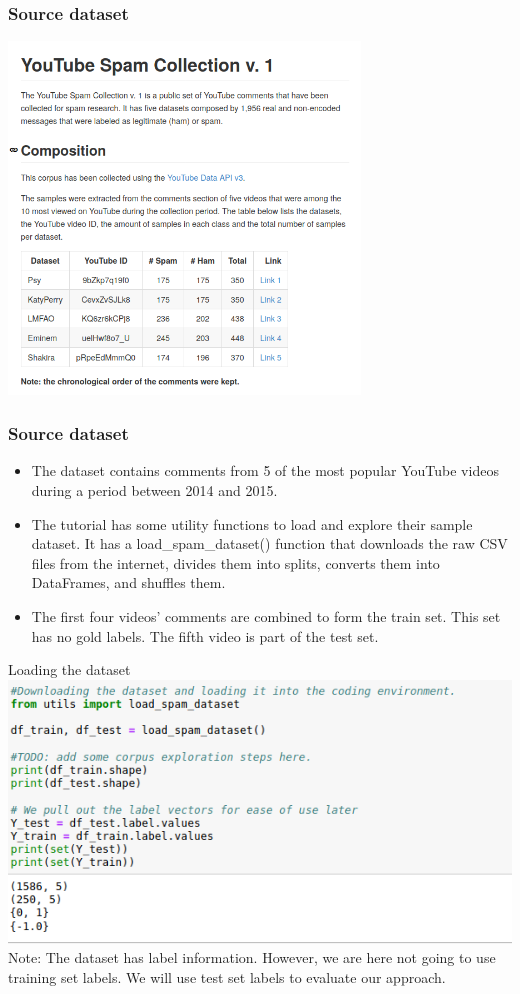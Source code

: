 \documentclass{beamer}
\begin{document}
\begin{frame}
\frametitle{Source dataset}
    \includegraphics[width=0.7\textwidth]{figures/youtubedataset.png}
\end{frame}

\begin{frame}[fragile]
\frametitle{Source dataset}
\begin{itemize}
    \item The dataset contains comments from 5 of the most popular YouTube videos during a period between 2014 and 2015.
    \item The tutorial has some utility functions to load and explore their sample dataset. It has a load\_spam\_dataset() function that downloads the raw CSV files from the internet, divides them into splits, converts them into DataFrames, and shuffles them.
    \item  The first four videos' comments are combined to form the train set. This set has no gold labels. The fifth video is part of the test set.
\end{itemize}
\end{frame}

\begin{frame}{Loading the dataset}
\includegraphics[width=\textwidth]{figures/loadingdatasnorkel.png}
Note: The dataset has label information. However, we are here not going to use training set labels. We will use test set labels to evaluate our approach. 
\end{frame}
\end{document}
